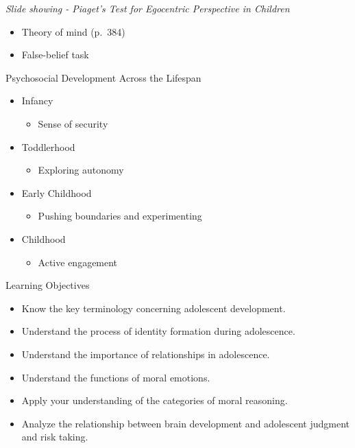 \documentclass[
]{book}
\providecommand{\tightlist}{%
  \setlength{\itemsep}{0pt}\setlength{\parskip}{0pt}}
\begin{document}
\begin{reflect}
\emph{Slide showing - Piaget's Test for Egocentric Perspective in Children}

\begin{itemize}
\tightlist
\item
  Theory of mind (p.~384)\\
\item
  False-belief task
\end{itemize}

Psychosocial Development Across the Lifespan

\begin{itemize}
\tightlist
\item
  Infancy

  \begin{itemize}
  \tightlist
  \item
    Sense of security\\
  \end{itemize}
\item
  Toddlerhood

  \begin{itemize}
  \tightlist
  \item
    Exploring autonomy\\
  \end{itemize}
\item
  Early Childhood

  \begin{itemize}
  \tightlist
  \item
    Pushing boundaries and experimenting\\
  \end{itemize}
\item
  Childhood

  \begin{itemize}
  \tightlist
  \item
    Active engagement
  \end{itemize}
\end{itemize}

Learning Objectives

\begin{itemize}
\tightlist
\item
  Know the key terminology concerning adolescent development.\\
\item
  Understand the process of identity formation during adolescence.\\
\item
  Understand the importance of relationships in adolescence.\\
\item
  Understand the functions of moral emotions.\\
\item
  Apply your understanding of the categories of moral reasoning.\\
\item
  Analyze the relationship between brain development and adolescent judgment and risk taking.
\end{itemize}


\end{reflect}
\end{document}

